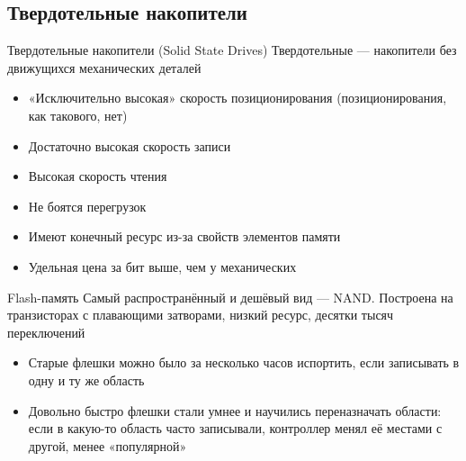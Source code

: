 \documentclass[xetex,aspectratio=43]{beamer}
\begin{document}
\subsection{Твердотельные накопители}

\begin{frame}{Твердотельные накопители (Solid State Drives)}
    Твердотельные --- накопители без движущихся механических деталей

    \begin{itemize}
        \tightlist
        \item
        «Исключительно высокая» скорость позиционирования (позиционирования,
        как такового, нет)
        \item
        Достаточно высокая скорость записи
        \item
        Высокая скорость чтения
    \end{itemize}

    \pause

    \begin{itemize}
        \tightlist
        \item
        Не боятся перегрузок
        \item
        Имеют конечный ресурс из-за свойств элементов памяти
        \item
        Удельная цена за бит выше, чем у механических
    \end{itemize}

\end{frame}

\begin{frame}
    \begin{block}{Flash-память}
        Самый распространённый и дешёвый вид --- NAND. Построена на транзисторах
        с плавающими затворами, низкий ресурс, десятки тысяч переключений

        \begin{itemize}
            \tightlist
            \item
            Старые флешки можно было за несколько часов испортить, если записывать
            в одну и ту же область
            \item
            Довольно быстро флешки стали умнее и научились переназначать области:
            если в какую-то область часто записывали, контроллер менял её местами
            с другой, менее «популярной»
        \end{itemize}
    \end{block}
\end{frame}
\end{document}
